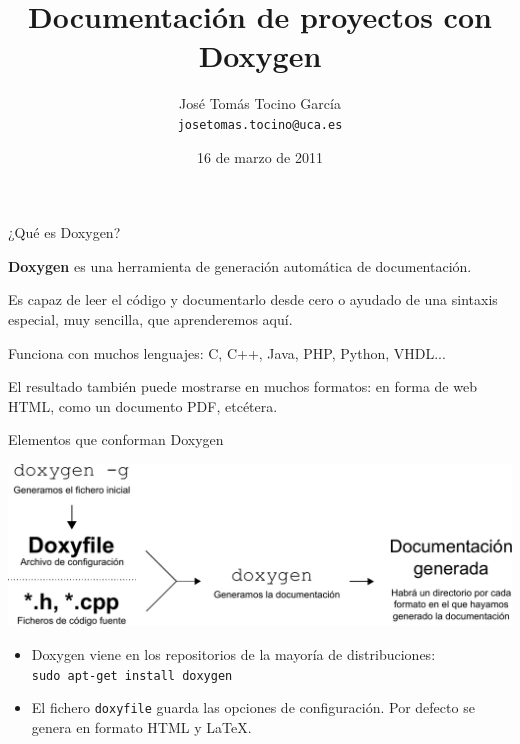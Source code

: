 \documentclass{beamer}
\title{Documentación de proyectos con Doxygen}
\author{José Tomás Tocino García \\ \texttt{josetomas.tocino@uca.es}}
\date{16 de marzo de 2011}
\begin{document}
\begin{frame}
  \titlepage
\end{frame}

\normalsize
 

\begin{frame}{¿Qué es Doxygen?}
  \begin{center}
    {\Large\textbf{Doxygen} es una herramienta de generación automática de
    documentación.}
  \end{center}
  Es capaz de leer el código y documentarlo desde cero o ayudado
  de una sintaxis especial, muy sencilla, que aprenderemos aquí.

  \bigskip

  Funciona con muchos lenguajes: C, C++, Java, PHP, Python, VHDL...

  \bigskip

  El resultado también puede mostrarse en muchos formatos: en forma de web HTML,
  como un documento PDF, etcétera.

\end{frame}

\begin{frame}{Elementos que conforman Doxygen}
  \begin{center}
    \includegraphics[width=\textwidth]{dibujo1}
  \end{center}
  
  \begin{itemize}
  \item Doxygen viene en los repositorios de la mayoría de distribuciones:\\
    \texttt{sudo apt-get install doxygen}
  \item El fichero \texttt{doxyfile} guarda las opciones de configuración. Por
    defecto se genera en formato HTML y \LaTeX.
  
  \end{itemize}
\end{frame}
\end{document}
